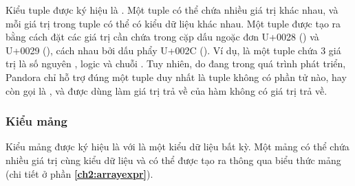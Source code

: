     Kiểu tuple được ký hiệu là . Một tuple có thể chứa nhiều giá trị khác nhau, và mỗi giá trị trong tuple có thể có kiểu dữ liệu khác nhau. Một tuple được tạo ra bằng cách đặt các giá trị cần chứa trong cặp dấu ngoặc đơn U+0028 (\kw{(}) và U+0029 (\kw{)}), cách nhau bởi dấu phẩy U+002C (\kw{,}). Ví dụ,  là một tuple chứa 3 giá trị là số nguyên , logic  và chuỗi . Tuy nhiên, do đang trong quá trình phát triển, Pandora chỉ hỗ trợ đúng một tuple duy nhất là tuple không có phần tử nào, hay còn gọi là , và được dùng làm giá trị trả về của hàm không có giá trị trả về.

\subsubsection{Kiểu mảng}

    Kiểu mảng được ký hiệu là \kw{[T]} với  là một kiểu dữ liệu bất kỳ. Một mảng có thể chứa nhiều giá trị cùng kiểu dữ liệu và có thể được tạo ra thông qua biểu thức mảng (chi tiết ở phần \textbf{\ref{ch2:arrayexpr}}).
